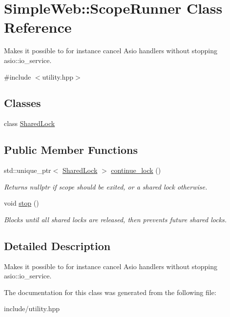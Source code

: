 \hypertarget{classSimpleWeb_1_1ScopeRunner}{}\section{Simple\+Web\+:\+:Scope\+Runner Class Reference}
\label{classSimpleWeb_1_1ScopeRunner}


Makes it possible to for instance cancel Asio handlers without stopping asio\+::io\+\_\+service.  




{\ttfamily \#include $<$utility.\+hpp$>$}

\subsection*{Classes}
\begin{DoxyCompactItemize}
\item 
class \hyperlink{classSimpleWeb_1_1ScopeRunner_1_1SharedLock}{Shared\+Lock}
\end{DoxyCompactItemize}
\subsection*{Public Member Functions}
\begin{DoxyCompactItemize}
\item 
std\+::unique\+\_\+ptr$<$ \hyperlink{classSimpleWeb_1_1ScopeRunner_1_1SharedLock}{Shared\+Lock} $>$ \hyperlink{classSimpleWeb_1_1ScopeRunner_abb6f22b69338f5a822949f12d249acaf}{continue\+\_\+lock} ()\hypertarget{classSimpleWeb_1_1ScopeRunner_abb6f22b69338f5a822949f12d249acaf}{}\label{classSimpleWeb_1_1ScopeRunner_abb6f22b69338f5a822949f12d249acaf}

\begin{DoxyCompactList}\small\item\em Returns nullptr if scope should be exited, or a shared lock otherwise. \end{DoxyCompactList}\item 
void \hyperlink{classSimpleWeb_1_1ScopeRunner_ae4e17e0e391776f720b3d22d90b78c02}{stop} ()\hypertarget{classSimpleWeb_1_1ScopeRunner_ae4e17e0e391776f720b3d22d90b78c02}{}\label{classSimpleWeb_1_1ScopeRunner_ae4e17e0e391776f720b3d22d90b78c02}

\begin{DoxyCompactList}\small\item\em Blocks until all shared locks are released, then prevents future shared locks. \end{DoxyCompactList}\end{DoxyCompactItemize}


\subsection{Detailed Description}
Makes it possible to for instance cancel Asio handlers without stopping asio\+::io\+\_\+service. 

The documentation for this class was generated from the following file\+:\begin{DoxyCompactItemize}
\item 
include/utility.\+hpp\end{DoxyCompactItemize}
